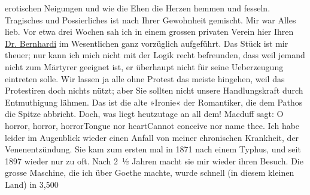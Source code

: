 \begin{ledgroupsized}[t]{13cm}
                    erotischen Neigungen und wie die Ehen die Herzen hemmen und fesseln. Tragisches
                    und Possierliches ist nach Ihrer Gewohnheit gemischt. Mir war Alles lieb.\pend
           \pstart
           Vor etwa drei Wochen sah ich in {\pb}einem grossen privaten
                    Verein hier Ihren \uline{Dr. Bernhardi} im Wesentlichen ganz vorzüglich aufgeführt. Das Stück ist mir theuer; nur
                    kann ich mich nicht mit der Logik recht befreunden, dass weil jemand nicht zum
                    Märtyrer geeignet ist, er überhaupt nicht für seine Ueberzeugung eintreten
                    solle. Wir lassen ja alle ohne Protest das meiste hingehen, weil das Protestiren
                    doch nichts nützt; aber Sie sollten nicht unsere Handlungskraft durch
                    Entmuthigung lähmen. Das ist die alte »Ironie« der Romantiker, die dem Pathos
                    die Spitze abbricht.\pend
           \pstart
           Doch, was liegt heutzutage an all dem! Macduff sagt:\pend
           \stanza{}O horror, horror, horror\newverse{}Tongue nor heart\newverse{}Cannot conceive nor name
                            thee.\stanzaend{}\pstart
           {\pb}Ich habe leider im
                    Augenblick wieder einen Anfall von meiner chronischen Krankheit, der
                    Venenentzündung. Sie kam zum ersten mal in 1871 nach einem Typhus,
                    und seit 1897 wieder nur zu oft. Nach 2 ½ Jahren macht sie mir
                    wieder ihren Besuch.\pend
           \pstart
           Die grosse Maschine, die ich
                    über Goethe machte, wurde schnell (in diesem
                    kleinen Land) in 3,500

\end{ledgroupsized}
